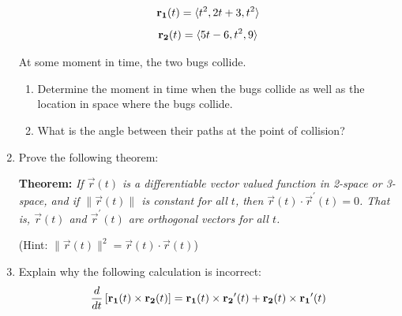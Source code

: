 \documentclass[12pt]{article}
\newif\ifans
\begin{document}
\begin{enumerate}
$${\bf r_1}(t)=\langle t^2, 2t+3, t^2\rangle$$
$${\bf r_2}(t)=\langle 5t-6, t^2, 9\rangle$$

At some moment in time, the two bugs collide.

\begin{enumerate}

\item Determine the moment in time when the bugs collide as well as the location in space where the bugs collide.

\ifans{\fbox{The bugs intersect when $t=3$.  This corresponds to the point $(x,y,z)=(9,9,9)$.}} \fi

\item What is the angle between their paths at the point of collision?

\ifans{\fbox{$\cos^{-1}\left(\frac{42}{\sqrt{76}\sqrt{61}}\right)$}} \fi

\end{enumerate}

\item Prove the following theorem:

{\bf Theorem:} \emph{If $\overrightarrow{r}(t)$ is a differentiable vector valued function in 2-space or 3-space, and if $\|\overrightarrow{r}(t)\|$ is constant for all $t$, then $\overrightarrow{r}(t)\cdot\overrightarrow{r}^{\prime}(t)=0$.  That is, $\overrightarrow{r}(t)$ and $\overrightarrow{r}^{\prime}(t)$ are orthogonal vectors for all $t$.}

(Hint: $\|\overrightarrow{r}(t)\|^2=\overrightarrow{r}(t)\cdot\overrightarrow{r}(t)$)

\ifans{\fbox{\parbox{1\linewidth}{Suppose $\|\overrightarrow{r}(t)\|=k$, where $k$ is constant.  Then:
\begin{align*}
\|\overrightarrow{r}(t)\|^2&=k^2\\
\overrightarrow{r}(t)\cdot\overrightarrow{r}(t)&=k^2\\
\frac{d}{dt}\left[\overrightarrow{r}(t)\cdot\overrightarrow{r}(t)\right]&=\frac{d}{dt}\left(k^2\right)\\
\overrightarrow{r}(t)\cdot \overrightarrow{r}^{\prime}(t)+\overrightarrow{r}^{\prime}(t)\cdot \overrightarrow{r}(t)&=0\\
2\left[\overrightarrow{r}(t)\cdot \overrightarrow{r}^{\prime}(t)\right]&=0\\
\overrightarrow{r}(t)\cdot \overrightarrow{r}^{\prime}(t)&=0
\end{align*}
And, the result is proven.
}}} \fi

\item Explain why the following calculation is incorrect:
$$\frac{d}{dt}\left[{\bf r_1}(t)\times{\bf r_2}(t)\right]={\bf r_1}(t)\times {\bf r_2}^{\prime}(t)+{\bf r_2}(t)\times{\bf r_1}^{\prime}(t)$$


\end{enumerate}
\end{document}
